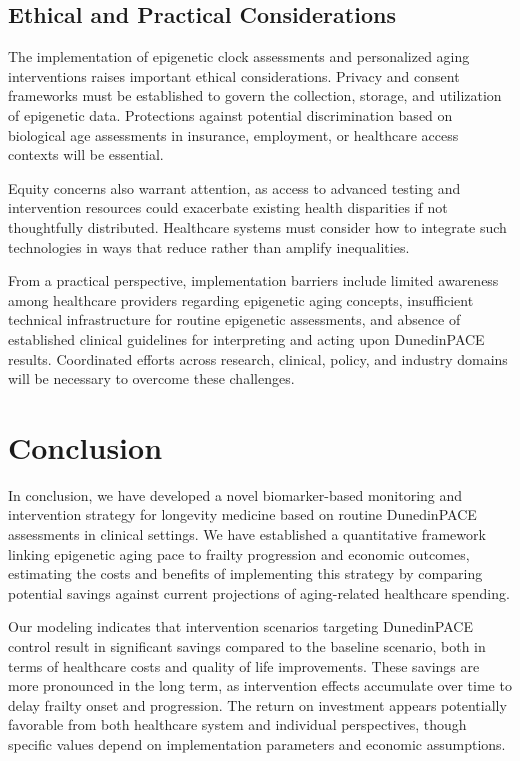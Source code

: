 \subsection{Ethical and Practical Considerations}

The implementation of epigenetic clock assessments and personalized aging interventions raises important ethical considerations. Privacy and consent frameworks must be established to govern the collection, storage, and utilization of epigenetic data. Protections against potential discrimination based on biological age assessments in insurance, employment, or healthcare access contexts will be essential.

Equity concerns also warrant attention, as access to advanced testing and intervention resources could exacerbate existing health disparities if not thoughtfully distributed. Healthcare systems must consider how to integrate such technologies in ways that reduce rather than amplify inequalities.

From a practical perspective, implementation barriers include limited awareness among healthcare providers regarding epigenetic aging concepts, insufficient technical infrastructure for routine epigenetic assessments, and absence of established clinical guidelines for interpreting and acting upon DunedinPACE results. Coordinated efforts across research, clinical, policy, and industry domains will be necessary to overcome these challenges.

\section{Conclusion}

In conclusion, we have developed a novel biomarker-based monitoring and intervention strategy for longevity medicine based on routine DunedinPACE assessments in clinical settings. We have established a quantitative framework linking epigenetic aging pace to frailty progression and economic outcomes, estimating the costs and benefits of implementing this strategy by comparing potential savings against current projections of aging-related healthcare spending.

Our modeling indicates that intervention scenarios targeting DunedinPACE control result in significant savings compared to the baseline scenario, both in terms of healthcare costs and quality of life improvements. These savings are more pronounced in the long term, as intervention effects accumulate over time to delay frailty onset and progression. The return on investment appears potentially favorable from both healthcare system and individual perspectives, though specific values depend on implementation parameters and economic assumptions.


